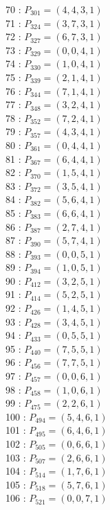 \documentclass{article}
\begin{document}
{\begin{multicols}{3}
70 : $P_{301}=( 4, 4, 3, 1 )$\\
71 : $P_{324}=( 3, 7, 3, 1 )$\\
72 : $P_{327}=( 6, 7, 3, 1 )$\\
73 : $P_{329}=( 0, 0, 4, 1 )$\\
74 : $P_{330}=( 1, 0, 4, 1 )$\\
75 : $P_{339}=( 2, 1, 4, 1 )$\\
76 : $P_{344}=( 7, 1, 4, 1 )$\\
77 : $P_{348}=( 3, 2, 4, 1 )$\\
78 : $P_{352}=( 7, 2, 4, 1 )$\\
79 : $P_{357}=( 4, 3, 4, 1 )$\\
80 : $P_{361}=( 0, 4, 4, 1 )$\\
81 : $P_{367}=( 6, 4, 4, 1 )$\\
82 : $P_{370}=( 1, 5, 4, 1 )$\\
83 : $P_{372}=( 3, 5, 4, 1 )$\\
84 : $P_{382}=( 5, 6, 4, 1 )$\\
85 : $P_{383}=( 6, 6, 4, 1 )$\\
86 : $P_{387}=( 2, 7, 4, 1 )$\\
87 : $P_{390}=( 5, 7, 4, 1 )$\\
88 : $P_{393}=( 0, 0, 5, 1 )$\\
89 : $P_{394}=( 1, 0, 5, 1 )$\\
90 : $P_{412}=( 3, 2, 5, 1 )$\\
91 : $P_{414}=( 5, 2, 5, 1 )$\\
92 : $P_{426}=( 1, 4, 5, 1 )$\\
93 : $P_{428}=( 3, 4, 5, 1 )$\\
94 : $P_{433}=( 0, 5, 5, 1 )$\\
95 : $P_{440}=( 7, 5, 5, 1 )$\\
96 : $P_{456}=( 7, 7, 5, 1 )$\\
97 : $P_{457}=( 0, 0, 6, 1 )$\\
98 : $P_{458}=( 1, 0, 6, 1 )$\\
99 : $P_{475}=( 2, 2, 6, 1 )$\\
100 : $P_{494}=( 5, 4, 6, 1 )$\\
101 : $P_{495}=( 6, 4, 6, 1 )$\\
102 : $P_{505}=( 0, 6, 6, 1 )$\\
103 : $P_{507}=( 2, 6, 6, 1 )$\\
104 : $P_{514}=( 1, 7, 6, 1 )$\\
105 : $P_{518}=( 5, 7, 6, 1 )$\\
106 : $P_{521}=( 0, 0, 7, 1 )$\\

\end{multicols}}
\end{document}
